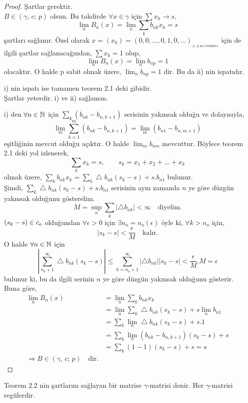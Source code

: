 \begin{proof}
Şartlar gerektir.\\[5pt]

$B\in(\gamma,\,c;\,p)$ olsun. Bu takdirde $\forall x\in\gamma$ için $\sum x_k\to s$,
$$
\lim_nB_n(x)=\lim_n\sum_kb_{nk}x_k=s
$$
şartları sağlanır. Özel olarak $x=(x_k)=(0,0,\ldots,0,1,0,\ldots)_{_\text{(1, p.nci terimde)}}$ için de ilgili şartlar sağlanacağından, $\sum x_k=1$ olup,
$$
\lim_nB_n(x)=\lim_nb_{np}=1
$$
olacaktır. O halde p sabit olmak üzere, $\lim_nb_{np}=1$ dir. Bu da ii) nin ispatıdır.

i) nin ispatı ise tamamen teorem 2.1 deki gibidir.\\[5pt]

Şartlar yeterdir.  i) ve ii) sağlansın.

i) den $\forall n\in\mathbb{N}$ için $\sum_k(b_{nk}-b_{n,k+1})$ serisinin yakınsak olduğu ve dolayısıyla,
$$
\lim_m\sum\limits_{k=1}^m(b_{nk}-b_{n,k+1})=\lim_m(b_{n1}-b_{n,m+1})
$$
eşitliğinin mevcut olduğu açıktır. O halde $\lim_mb_{nm}$ mevcuttur. Böylece teorem 2.1 deki yol izlenerek,
$$
\sum_kx_k=s,\qquad s_k=x_1+x_2+\ldots+x_k
$$
olmak üzere, $\sum\limits_kb_{nk}x_k=\sum\limits_k\bigtriangleup b_{nk}(s_k-s)+s.b_{n1}$ bulunur.\\[2pt]

Şimdi, $\sum\limits_k\bigtriangleup b_{nk}(s_k-s)+s.b_{n1}$ serisinin aynı zamanda $n$ ye göre düzgün yakınsak olduğunu gösterelim.
$$
M=\sup_n\sum_k|\bigtriangleup b_{nk}|<\infty\quad\text{diyelim.}
$$
$(s_k-s)\in c_o$ olduğundan $\forall\epsilon>0$ için $\exists n_o=n_o(\epsilon)$ öyle ki, $\forall k>n_o$ için,
$$
|s_k-s|<\frac{\epsilon}{M}\quad\text{kalır.}
$$
O halde $\forall n\in\mathbb{N}$ için
$$
\left|\sum\limits_{n_0+1}^\infty\bigtriangleup b_{nk}(s_k-s)\right|\leq\sum\limits_{k=n_o+1}^\infty|\bigtriangleup b_{nk}||s_k-s|<\frac{\epsilon}{M}.M=\epsilon
$$
bulunur ki, bu da ilgili serinin $n$ ye göre düzgün yakınsak olduğunu gösterir. Buna göre,
$$
\begin{aligned}
\lim_nB_n(x)&=\lim_n\sum_kb_{nk}x_k\\
&=\lim_n\sum_k\bigtriangleup b_{nk}(s_k-s)+s\lim_nb_{n1}\\
&=\sum_k\lim_n\bigtriangleup b_{nk}(s_k-s)+s.1\\
&=\sum_k\lim_n(b_{nk}-b_{n,k+1})(s_k-s)+s\\
&=\sum_k(1-1)(s_k-s)+s=s\\
\Rightarrow B\in(\gamma,\,c;\,p)\quad\text{dir.}
\end{aligned}
$$
\end{proof}
Teorem 2.2 nin şartlarını sağlayan bir matrise $\gamma$-matrisi denir. Her $\gamma$-matrisi regülerdir.\newpage


